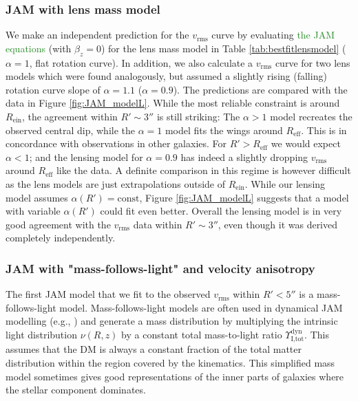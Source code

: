 \documentclass[useAMS,usenatbib]{mnras}
\newcommand{\NEW}[1]{\textcolor{ForestGreen}{#1}}
\newcommand{\OLD}[1]{}
\begin{document}
\subsubsection{JAM with lens mass model}

We make an independent prediction for the $v_\text{rms}$ curve by evaluating \OLD{Equation \eqref{eq:explicitLOSvelCap}}\NEW{the JAM equations} (with $\beta_z = 0$) for the lens mass model in Table \ref{tab:bestfitlensmodel} ($\alpha = 1$, flat rotation curve). In addition, we also calculate a  $v_\text{rms}$ curve for two lens models which were found analogously, but assumed a slightly rising (falling) rotation curve slope of $\alpha=1.1$ ($\alpha=0.9$). The predictions are compared with the data in Figure \ref{fig:JAM_modelL}. While the most reliable constraint is around $R_\text{ein}$, the agreement within $R' \sim 3''$ is still striking: The $\alpha > 1$ model recreates the observed central dip, while the $\alpha = 1$ model fits the wings around $R_\text{eff}$. This is in concordance with observations in other galaxies. For $R'> R_\text{eff}$ we would expect $\alpha<1$; and the lensing model for $\alpha=0.9$ has indeed a slightly dropping $v_\text{rms}$ around $R_\text{eff}$ like the data. A definite comparison in this regime is however difficult as the lens models are just extrapolations outside of $R_\text{ein}$. While our lensing model assumes $\alpha(R')=\text{const}$, Figure \ref{fig:JAM_modelL} suggests that a model with variable $\alpha(R')$ could fit even better. Overall the lensing model is in very good agreement with the $v_\text{rms}$ data within $R' \sim 3''$, even though it was derived completely independently.

\subsubsection{JAM with "mass-follows-light" and velocity anisotropy} \label{sec:results_JAM_SB_MfL}

The first JAM model that we fit to the observed $v_\text{rms}$ within $R'<5''$ is a mass-follows-light model. Mass-follows-light models are often used in dynamical JAM modelling (e.g., \citealt{GlennEC,Cap06}) and generate a mass distribution by multiplying the intrinsic light distribution $\nu(R,z)$ by a constant total mass-to-light ratio  $\Upsilon_\text{I,tot}^\text{dyn}$. This assumes that the DM is always a constant fraction of the total matter distribution within the region covered by the kinematics. This simplified mass model sometimes gives good representations of the inner parts of galaxies where the stellar component dominates.
\end{document}
